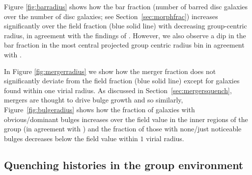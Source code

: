 \documentclass[useAMS,usenatbib]{mn2e}
\begin{document}
Figure \ref{fig:barradius} shows how the bar fraction (number of barred disc galaxies over the number of disc galaxies; see Section~\ref{sec:morphfrac}) increases significantly over the field fraction (blue solid line) with decreasing group-centric radius, in agreement with the findings of \cite{barazza09}. However, we also observe a dip in the bar fraction in the most central projected group centric radius bin in agreement with \cite{skibba12}. 

In Figure \ref{fig:mergerradius} we show how the merger fraction does not significantly deviate from the field fraction (blue solid line) except for galaxies found within one virial radius. As discussed in Section~\ref{sec:mergersquench}, mergers are thought to drive bulge growth and so similarly, Figure~\ref{fig:bulgeradius} shows how the fraction of galaxies with obvious/dominant bulges increases over the field value in the inner regions of the group (in agreement with \citealt{diaferio01}) and the fraction of those with none/just noticeable bulges decreases below the field value within $1$ virial radius. 




\subsection{Quenching histories in the group environment}\label{sec:resultssfhs}
\end{document}
